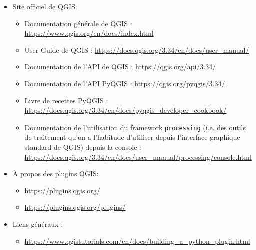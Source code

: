 \documentclass[11pt]{article}
\begin{document}
\begin{itemize}\itemsep0.64em
\renewcommand\labelitemi{\---}

\item Site officiel de QGIS:

\begin{itemize}\itemsep0.2em
\renewcommand\labelitemii{\--}
  \item Documentation générale de QGIS : \url{https://www.qgis.org/en/docs/index.html}
  \item User Guide de QGIS : \url{https://docs.qgis.org/3.34/en/docs/user_manual/}
  \item Documentation de l'API de QGIS : \url{https://qgis.org/api/3.34/}
  \item Documentation de l'API PyQGIS : \url{https://qgis.org/pyqgis/3.34/}
  \item Livre de recettes PyQGIS : \url{https://docs.qgis.org/3.34/en/docs/pyqgis_developer_cookbook/}
  \item Documentation de l'utilisation du framework \texttt{processing} (i.e. des outils de traitement qu'on a l'habitude d'utiliser depuis l'interface graphique standard de QGIS) depuis la console : \\
\url{https://docs.qgis.org/3.34/en/docs/user_manual/processing/console.html}
\end{itemize}

\item À propos des plugins QGIS:

\begin{itemize}\itemsep0.2em
\renewcommand\labelitemii{\--}
  \item \url{https://plugins.qgis.org/}
  \item \url{https://plugins.qgis.org/plugins/}
\end{itemize}

\item Liens généraux :

\begin{itemize}\itemsep0.2em
\renewcommand\labelitemii{\--}
  \item \url{https://www.qgistutorials.com/en/docs/building_a_python_plugin.html}
\end{itemize}
\end{itemize}

\vfill{}
\hrulefill
\vspace*{1.6em}

\hrulefill
\vspace*{1.6em}
\end{document}
